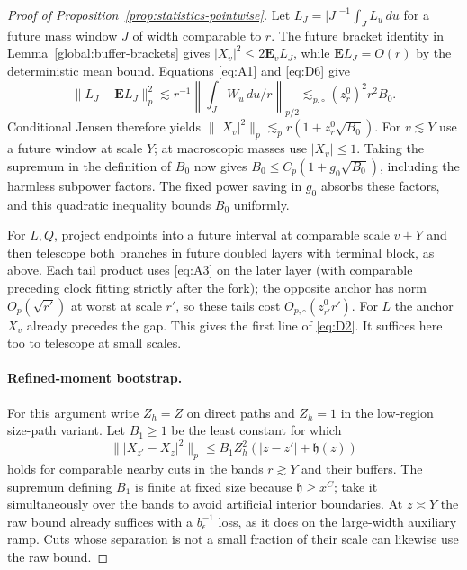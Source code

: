 \begin{proof}[Proof of Proposition~\ref{prop:statistics-pointwise}]
Let $L_J=|J|^{-1}\int_JL_u\,du$ for a future mass window
$J$ of width comparable to $r$.  The future bracket identity in
Lemma~\ref{global:buffer-brackets} gives
$|X_v|^2\le2\mathbf E_vL_J$, while $\mathbf EL_J=O(r)$ by the
deterministic mean bound.  Equations \eqref{eq:A1} and \eqref{eq:D6}
give
\[
 \|L_J-\mathbf EL_J\|_p^2
 \lesssim r^{-1}\left\|\int_JW_u\,du/r\right\|_{p/2}
 \lesssim_{p,\circ}(z_r^0)^2r^2B_0.
\]
Conditional Jensen therefore yields
$\||X_v|^2\|_p\lesssim_pr(1+z_r^0\sqrt{B_0})$.
For $v\lesssim Y$ use a future window at scale $Y$; at macroscopic
masses use $|X_v|\le1$.  Taking the supremum in the definition of $B_0$
now gives $B_0\le C_p(1+g_0\sqrt{B_0})$, including the harmless
subpower factors.  The fixed power saving in $g_0$ absorbs these
factors, and this quadratic inequality bounds $B_0$ uniformly.

For \(L,Q\), project endpoints into a future interval at comparable scale \(v+Y\) and then telescope both branches in future doubled layers with terminal block, as above. Each tail product uses \eqref{eq:A3} on the later layer (with comparable preceding clock fitting strictly after the fork); the opposite anchor has norm \(O_p(\sqrt{r'})\) at worst at scale \(r'\), so these tails cost \(O_{p,\circ}(z_{r'}^0 r')\). For \(L\) the anchor \(X_v\) already precedes the gap. This gives the first line of \eqref{eq:D2}. It suffices here too to telescope at small scales.

\paragraph{Refined-moment bootstrap.}
For this argument write $Z_h=Z$ on direct paths and $Z_h=1$ in the
low-region size-path variant. Let $B_1\ge1$ be the least constant for
which
\begin{equation*}
 \||X_{z'}-X_z|^2\|_p
 \le B_1Z_h^2(|z-z'|+\mathfrak h(z))
\end{equation*}
holds for comparable nearby cuts in the bands $r\gtrsim Y$ and their
buffers. The supremum defining $B_1$ is finite at fixed size because
$\mathfrak h\ge x^C$; take it simultaneously over the bands to avoid
artificial interior boundaries. At $z\asymp Y$ the raw bound already
suffices with a $b_\epsilon^{-1}$ loss, as it does on the large-width
auxiliary ramp. Cuts whose separation is not a small fraction of their
scale can likewise use the raw bound.


\end{proof}
